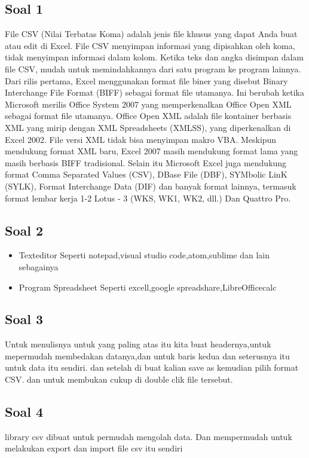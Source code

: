 \subsection{Soal 1}
File CSV (Nilai Terbatas Koma) adalah jenis file khusus yang dapat Anda buat atau edit di Excel. File CSV menyimpan informasi yang dipisahkan oleh koma, tidak menyimpan informasi dalam kolom. Ketika teks dan angka disimpan dalam file CSV, mudah untuk memindahkannya dari satu program ke program lainnya.
Dari rilis pertama, Excel menggunakan format file biner yang disebut Binary Interchange File Format (BIFF) sebagai format file utamanya. Ini berubah ketika Microsoft merilis Office System 2007 yang memperkenalkan Office Open XML sebagai format file utamanya. Office Open XML adalah file kontainer berbasis XML yang mirip dengan XML Spreadsheets (XMLSS), yang diperkenalkan di Excel 2002. File versi XML tidak bisa menyimpan makro VBA.
Meskipun mendukung format XML baru, Excel 2007 masih mendukung format lama yang masih berbasis BIFF tradisional. Selain itu Microsoft Excel juga mendukung format Comma Separated Values (CSV), DBase File (DBF), SYMbolic LinK (SYLK), Format Interchange Data (DIF) dan banyak format lainnya, termasuk format lembar kerja 1-2 Lotus - 3 (WKS, WK1, WK2, dll.) Dan Quattro Pro.

\subsection{Soal 2}
\begin{itemize}
    \item Texteditor
    Seperti notepad,visual studio code,atom,sublime dan lain sebagainya
    \item Program Spreadsheet
    Seperti excell,google spreadshare,LibreOfficecalc
\end{itemize}

\subsection{Soal 3}
Untuk menulisnya untuk yang paling atas itu kita buat headernya,untuk mepermudah membedakan datanya,dan untuk baris kedua dan seterusnya itu untuk data itu sendiri.
dan setelah di buat kalian save as kemudian pilih format CSV.
dan untuk membukan cukup di double clik file tersebut.

\subsection{Soal 4}
library csv dibuat untuk permudah mengolah data. Dan mempermudah untuk melakukan export dan import file csv itu sendiri

